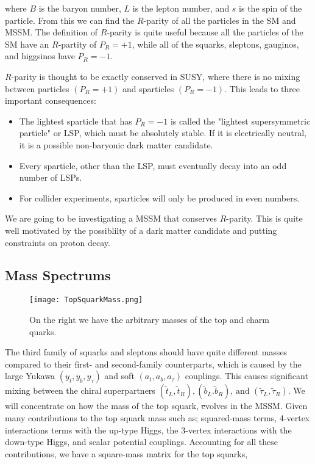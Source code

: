 where $B$ is the baryon number, $L$ is the lepton number, and $s$ is the spin of the particle. From this we can find the $R$-parity of all the particles in the SM and MSSM. The definition of $R$-parity is quite useful because all the particles of the SM have an $R$-partity of $P_R=+1$, while all of the squarks, sleptons, gauginos, and higgsinos have $P_R=-1$.

$R$-parity is thought to be exactly conserved in SUSY, where there is no mixing between particles $(P_R=+1)$ and sparticles $(P_R=-1)$. This leads to three important consequences:

 \begin{itemize}
	 \item The lightest sparticle that has $P_R=-1$ is called the "lightest supersymmetric particle" or LSP, which must be absolutely stable. If it is electrically neutral, it is a possible non-baryonic dark matter candidate.
	 \item Every sparticle, other than the LSP, must eventually decay into an odd number of LSPs.
	 \item For collider experiments, sparticles will only be produced in even numbers.
 \end{itemize}
 
 We are going to be investigating a MSSM that conserves $R$-parity. This is quite well motivated by the possiblilty of a dark matter candidate and putting constraints on proton decay. 

\subsection{Mass Spectrums}

\begin{figure}
\centering
	\texttt{[image: TopSquarkMass.png]}
 	\caption{On the right we have the arbitrary masses of the top and charm quarks.}
 	\label{StopMass} 
\end{figure}

The third family of squarks and sleptons should have quite different masses compared to their first- and second-family counterparts, which is caused by the large Yukawa $(y_t, y_b, y_\tau)$ and soft $(a_t, a_b, a_\tau)$ couplings. This causes significant mixing between the chiral superpartners $(\widetilde{t}_L, \widetilde{t}_R), (\widetilde{b}_L. \widetilde{b}_R)\text{, and } (\widetilde{\tau}_L, \widetilde{\tau}_R)$. We will concentrate on how the mass of the top squark, \st evolves in the MSSM. Given many contributions to the top squark mass such as; squared-mass terms, 4-vertex interactions terms with the up-type Higgs, the 3-vertex interactions with the down-type Higgs, and scalar potential couplings. Accounting for all these contributions, we have a square-mass matrix for the top squarks, 


